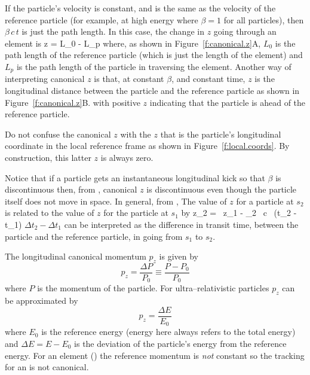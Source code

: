 If the particle's velocity is constant, and is
the same as the velocity of the reference particle (for example, at
high energy where $\beta = 1$ for all particles), then $\beta \, c \,
t$ is just the path length. In this case, the change in $z$ going
through an element is
\Begineq
  \Delta z = L_0 - L_p
\Endeq
where, as shown in Figure~\ref{f:canonical.z}A, $L_0$ is the path
length of the reference particle (which is just the length of the
element) and $L_p$ is the path length of the particle in traversing
the element.  Another way of interpreting canonical $z$ is that, at
constant $\beta$, and constant time, $z$ is the longitudinal distance
between the particle and the reference particle as shown in
Figure~\ref{f:canonical.z}B. with positive $z$ indicating that the
particle is ahead of the reference particle.

Do not confuse the canonical $z$ with the $z$ that is the particle's
longitudinal coordinate in the local reference frame as shown in
Figure~\ref{f:local.coords}. By construction, this latter $z$ is
always zero.

Notice that if a particle gets an instantaneous longitudinal kick so
that $\beta$ is discontinuous then, from , canonical $z$ is
discontinuous even though the particle itself does not move in
space. In general, from , The value of $z$ for a particle at
$s_2$ is related to the value of $z$ for the particle at $s_1$ by
\Begineq
  z_2 =  \, z_1 - 
  \beta_2 \, c \, (\Delta t_2 - \Delta t_1)
  \label{zbbzb}
\Endeq
$\Delta t_2 - \Delta t_1$ can be interpreted as the difference in
transit time, between the particle and the reference particle, in going
from $s_1$ to $s_2$.

The longitudinal canonical momentum $p_z$ is given by
\begin{equation}
  p_z = \frac{\Delta P}{P_0} \equiv \frac{P - P_0}{P_0}
\end{equation}
where $P$ is the momentum of the particle. For ultra--relativistic particles
$p_z$ can be approximated by
\begin{equation}
  p_z = \frac{\Delta E}{E_0}
\end{equation}
where $E_0$ is the reference energy (energy here always refers to the
total energy) and $\Delta E = E - E_0$ is the deviation of the
particle's energy from the reference energy. For an 
element () the reference momentum is {\it not} constant
so the tracking for an  is not canonical.

